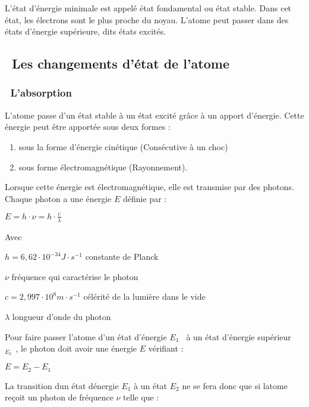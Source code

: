 \documentclass[12pt,twoside]{article}
\newcommand\textsubscript[1]{\ensuremath{{}_{\text{#1}}}}
\newcommand\liststyleLii{%
\renewcommand\labelitemi{[25CF?]}
\renewcommand\labelitemii{[25CB?]}
\renewcommand\labelitemiii{[25A0?]}
\renewcommand\labelitemiv{[25CF?]}
}
\begin{document}
L'\'etat d'\'energie minimale est appel\'e \'etat fondamental ou \'etat
stable. Dans cet \'etat, les \'electrons sont le plus proche du noyau.
L'atome peut passer dans des \'etats d'\'energie sup\'erieure, dits
\'etats excit\'es.

\subsection[\ Les changements d'\'etat de l'atome]{\ Les changements
d'\'etat de l'atome}
\subsubsection[\ L'absorption]{\ L'absorption}
L'atome passe d'un \'etat stable \`a un \'etat excit\'e gr\^ace \`a un
apport d'\'energie. Cette \'energie peut \^etre apport\'ee sous deux
formes :

\liststyleLii
\begin{enumerate}
\item sous la forme d'\'energie cin\'etique (Cons\'ecutive \`a un choc)
\item sous forme \'electromagn\'etique (Rayonnement).
\end{enumerate}
Lorsque cette \'energie est \'electromagn\'etique, elle est transmise
par des photons. Chaque photon a une \'energie $E$ d\'efinie par :

{\centering
 $E=h\cdot \nu =h\cdot {\frac{c}{\lambda }}$ 
\par}

Avec

 $h=6,62\cdot 10^{-34}J\cdot s^{-1}$ constante de Planck

 $\nu $ fr\'equence qui caract\'erise le photon

 $c=2,997\cdot 10^{8}m\cdot s^{-1}$ c\'el\'erit\'e de la lumi\`ere dans
le vide 

 $\lambda $  longueur d'onde du photon


\bigskip

Pour faire passer l'atome d'un \'etat d'\'energie $E_{1}$
\textsubscript{ }\`a un \'etat d'\'energie sup\'erieur \textsubscript{
$E_{2}$ }, le photon doit avoir une \'energie  $E$ v\'erifiant :

{\centering
 $E=E_{2}-E_{1}$ 
\par}


\bigskip

La transition d{\textquotesingle}un \'etat d{\textquotesingle}\'energie 
$E_{1}$ \`a un \'etat  $E_{2}$ ne se fera donc que si
l{\textquotesingle}atome re\c{c}oit un photon de fr\'equence $\nu $
telle que :
\end{document}
